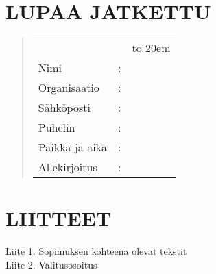 \documentclass[a4paper,finnish]{article}
\begin{document}
\section{LUPAA JATKETTU}

\begin{quote}
  \def\arraystretch{1.2}
\begin{tabular}{lcl}
    &&\hbox to 20em{}\\
    Nimi&:&\\
    \cline{3-3}
    Organisaatio&:&\\
    \cline{3-3}
    Sähköposti&:&\\
    \cline{3-3}
    Puhelin&:&\\
    \cline{3-3}
	Paikka ja aika&:&\\
	\cline{3-3}
	Allekirjoitus&:&\\
	\cline{3-3}
\end{tabular}
\end{quote}

\section{LIITTEET}
Liite 1. Sopimuksen kohteena olevat tekstit \\
Liite 2. Valitusosoitus \\
\end{document}
